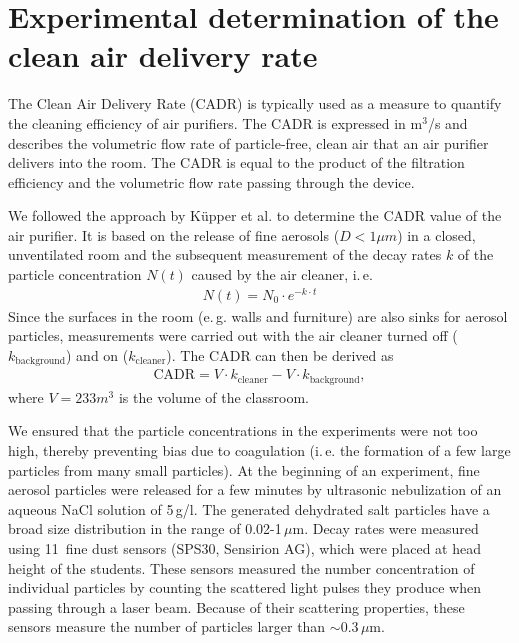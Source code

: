 \documentclass[fleqn,11pt]{wlscirep_supp}
\newcommand\ie{i.\,e.\xspace}
\newcommand\eg{e.\,g.\xspace}
\begin{document}
\listoftables


\newpage

\section{Experimental determination of the clean air delivery rate}\label{sec:cadr}

The Clean Air Delivery Rate (CADR) is typically used as a measure to quantify the cleaning efficiency of air purifiers\cite{Nelson1993IndoorEnv}. The CADR is expressed in m$^3$/s and describes the volumetric flow rate of particle-free, clean air that an air purifier delivers into the room. The CADR is equal to the product of the filtration efficiency and the volumetric flow rate passing through the device.

We followed the approach by K\"{u}pper et al.\cite{Kuepper20199AAQR} to determine the CADR value of the air purifier. It is based on the release of fine aerosols ($D < 1 \mu m$) in a closed, unventilated room and the subsequent measurement of the decay rates $k$ of the particle concentration $N(t)$ caused by the air cleaner, \ie
\begin{align}
    N(t) = N_0 \cdot e^{-k\cdot t}
\end{align}
Since the surfaces in the room (\eg walls and furniture) are also sinks for aerosol particles, measurements were carried out with the air cleaner turned off ($k_\mathrm{background}$) and on ($k_\mathrm{cleaner}$). The CADR can then be derived as
\begin{align}
    \mathrm{CADR} = V \cdot k_\mathrm{cleaner} - V \cdot k_\mathrm{background},
\end{align}
where $V = 233 m^3$ is the volume of the classroom.

We ensured that the particle concentrations in the experiments were not too high, thereby preventing bias due to coagulation (\ie the formation of a few large particles from many small particles). At the beginning of an experiment, fine aerosol particles were released for a few minutes by ultrasonic nebulization of an aqueous NaCl solution of 5\,g/l. The generated dehydrated salt particles have a broad size distribution in the range of 0.02-1\,$\mu$m. Decay rates were measured using 11~fine dust sensors (SPS30, Sensirion AG), which were placed at head height of the students. These sensors measured the number concentration of individual particles by counting the scattered light pulses they produce when passing through a laser beam. Because of their scattering properties, these sensors measure the number of particles larger than $\sim$0.3\,$\mu$m.
\end{document}
